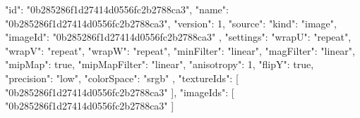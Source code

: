 {
  "id": "0b285286f1d27414d0556fc2b2788ca3",
  "name": "0b285286f1d27414d0556fc2b2788ca3",
  "version": 1,
  "source": {
    "kind": "image",
    "imageId": "0b285286f1d27414d0556fc2b2788ca3"
  },
  "settings": {
    "wrapU": "repeat",
    "wrapV": "repeat",
    "wrapW": "repeat",
    "minFilter": "linear",
    "magFilter": "linear",
    "mipMap": true,
    "mipMapFilter": "linear",
    "anisotropy": 1,
    "flipY": true,
    "precision": "low",
    "colorSpace": "srgb"
  },
  "textureIds": [
    "0b285286f1d27414d0556fc2b2788ca3"
  ],
  "imageIds": [
    "0b285286f1d27414d0556fc2b2788ca3"
  ]
}
